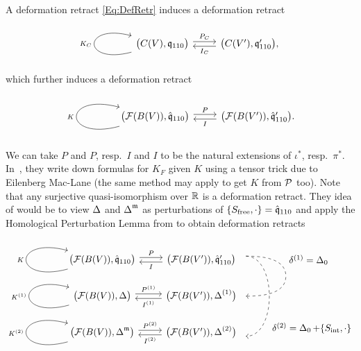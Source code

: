 \documentclass[\MainFolder/Text.tex]{subfiles}
\begin{document}
A deformation retract \eqref{Eq:DefRetr} induces a deformation retract
\begin{equation*}
\begin{tikzcd}
\bigl(\CycC(V),\OPQ_{110}\bigr) \arrow[loop left]{l}{K_\CycC}\arrow[shift left]{r}{P_\CycC} & \arrow[shift left]{l}{I_\CycC} \bigl(\CycC(V'),\OPQ_{110}'\bigr),
\end{tikzcd}
\end{equation*}
which further induces a deformation retract
\begin{equation*}
\begin{tikzcd}
\bigl(\Fun(B(V)),\hat{\OPQ}_{110}\bigr) \arrow[loop left]{l}{K}\arrow[shift left]{r}{P} & \arrow[shift left]{l}{I} \bigl(\Fun(B(V')),\hat{\OPQ}_{110}'\bigr).
\end{tikzcd}
\end{equation*}
We can take $P$ and $P$, resp.~$I$ and $I$ to be the natural extensions of $\iota^*$, resp.~$\pi^*$. In~\cite{Doubek2018}, they write down formulas for $K_F$ given $K$ using a tensor trick due to Eilenberg Mac-Lane (the same method may apply to get $K$ from $\mathcal{P}$ too). Note that any surjective quasi-isomorphism over $\mathbb{R}$ is a deformation retract. They idea of \cite{Doubek2018} would be to view $\operatorname{\Delta}$ and $\operatorname{\Delta}^{\mathfrak{m}}$ as perturbations of $\{S_{\mathrm{free}},\cdot\} = \hat{\mathfrak{q}}_{110}$ and apply the Homological Perturbation Lemma from \cite{Crainic2004} to obtain deformation retracts
\begin{equation*}\begin{tikzcd}[execute at end picture={
\draw[->,dashed] (3.5,1.5) to[out=0,in=90] node[midway,right,xshift=.5cm]{$\delta^{(1)} = \BVOp_0$} (5,.75) to[out=-90,in=0] (3.5,0);
\draw[->,dashed] (3.5,1.5) to[out=0,in=0] node[pos=0.8,right,xshift=.3cm]{$\delta^{(2)} = \BVOp_0 + \{\IntAction,\cdot\}$} (3.5,-1.5);
}]
\bigl(\Fun(B(V)),\hat{\OPQ}_{110}\bigr) \arrow[loop left]{l}{K}\arrow[shift left]{r}{P} & \arrow[shift left]{l}{I} \bigl(\Fun(B(V')),\hat{\OPQ}_{110}'\bigr) \\
\bigl(\Fun(B(V)),\BVOp \bigr) \arrow[loop left]{l}{K^{(1)}}\arrow[shift left]{r}{P^{(1)}} & \arrow[shift left]{l}{I^{(1)}} \bigl(\Fun(B(V')),\BVOp^{(1)}\bigr)\\
\bigl(\Fun(B(V)),\BVOp^\MC \bigr) \arrow[loop left]{l}{K^{(2)}}\arrow[shift left]{r}{P^{(2)}} & \arrow[shift left]{l}{I^{(2)}} \bigl(\Fun(B(V')),\BVOp^{(2)}\bigr)
\end{tikzcd}\end{equation*}
\end{document}
